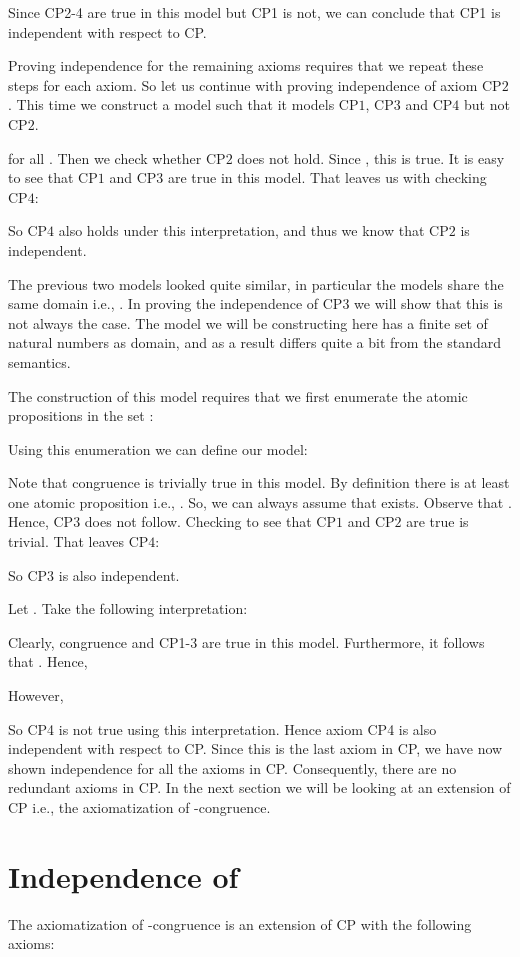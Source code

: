 \documentclass[a4paper,twoside,openright]{report}
\newcommand{\CP}[1]{\ensuremath{\mathrm{CP#1}}}
\begin{document}
Since CP2-4 are true in this model but CP1 is not, we can conclude that CP1 is independent with respect to CP.

Proving independence for the remaining axioms requires that we repeat these steps for each axiom. So let us continue with proving independence of axiom \CP2. This time we construct a model such that it models \CP1, \CP3 and \CP4 but not \CP2.

for all . Then we check whether \CP2 does not hold. Since , this is true. It is easy to see that \CP1 and \CP3 are true in this model. That leaves us with checking \CP4:

So \CP4 also holds under this interpretation, and thus we know that \CP2 is independent.

The previous two models looked quite similar, in particular the models share the same domain i.e., . In proving the independence of \CP3 we will show that this is not always the case. The model we will be constructing here has a finite set of natural numbers as domain, and as a result differs quite a bit from the standard semantics.

The construction of this model requires that we first enumerate the atomic propositions in the set :

Using this enumeration we can define our model: 

Note that congruence is trivially true in this model. By definition there is at least one atomic proposition i.e., . So, we can always assume that  exists. Observe that . Hence, \CP3 does not follow. Checking to see that \CP1 and \CP2 are true is trivial. That leaves \CP4:

So \CP3 is also independent.

Let . Take the following interpretation:

Clearly, congruence and CP1-3 are true in this model. Furthermore, it follows that . Hence,

However,

So CP4 is not true using this interpretation. Hence axiom CP4 is also independent with respect to CP. Since this is the last axiom in CP, we have now shown independence for all the axioms in CP. Consequently, there are no redundant axioms in CP. In the next section we will be looking at an extension of CP i.e., the axiomatization of -congruence.

\section{Independence of }
The axiomatization of -congruence is an extension of CP with the following axioms:
\end{document}
